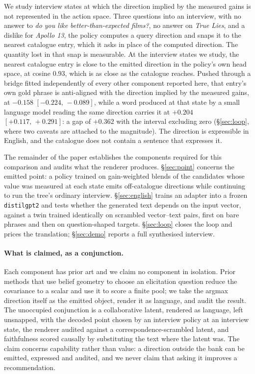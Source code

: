 \documentclass[11pt]{article}
\begin{document}
We study interview states at which the direction implied by the measured gains is not represented in
the action space. Three questions into an interview, with no answer to \emph{do you like
better-than-expected films?}, no answer on \emph{True Lies}, and a dislike for \emph{Apollo 13}, the
policy computes a query direction and snaps it to the nearest catalogue entry, which it asks in place
of the computed direction. The quantity lost in that snap is measurable. At the interview states we
study, the nearest catalogue entry is close to the emitted direction in the policy's own head space,
at cosine $0.93$, which is as close as the catalogue reaches. Pushed through a bridge fitted
independently of every other component reported here, that entry's own gold phrase is anti-aligned
with the direction implied by the measured gains, at $-0.158$ $[-0.224,\,-0.089]$, while a word
produced at that state by a small language model reading the same direction carries it at $+0.204$
$[+0.117,\,+0.291]$: a gap of $+0.362$ with the interval excluding zero (\S\ref{sec:loop}, where two
caveats are attached to the magnitude). The direction is expressible in English, and the catalogue
does not contain a sentence that expresses it.

The remainder of the paper establishes the components required for this comparison and audits what
the renderer produces. \S\ref{sec:point} concerns the emitted point: a policy trained on gain-weighted
blends of the candidates whose value was measured at each state emits off-catalogue directions while
continuing to run the tree's ordinary interview. \S\ref{sec:english} trains an adapter into a frozen
\texttt{distilgpt2} and tests whether the generated text depends on the input vector, against a twin
trained identically on scrambled vector--text pairs, first on bare phrases and then on question-shaped
targets. \S\ref{sec:loop} closes the loop and prices the translation; \S\ref{sec:demo} reports a full
synthesised interview.

\paragraph{What is claimed, as a conjunction.} Each component has prior art and we claim no component
in isolation. Prior methods that use belief geometry to choose an elicitation question reduce the
covariance to a scalar and use it to score a finite pool; we take the argmax direction itself as the
emitted object, render it as language, and audit the result. The unoccupied conjunction is a
collaborative latent, rendered as language, left unsnapped, with the decoded point chosen by an
interview policy at an interview state, the renderer audited against a correspondence-scrambled
latent, and faithfulness scored causally by substituting the text where the latent was. The claim
concerns capability rather than value: a direction outside the bank can be emitted, expressed and
audited, and we never claim that asking it improves a recommendation.
\end{document}
